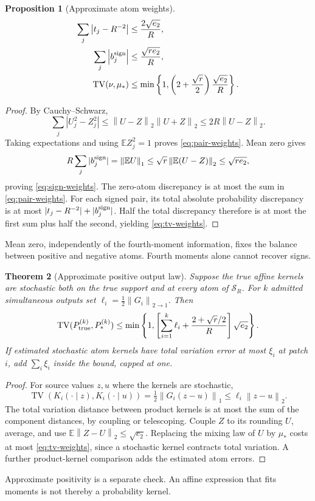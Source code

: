 \documentclass[11pt]{article}
\newtheorem{theorem}{Theorem}[section]
\newtheorem{proposition}[theorem]{Proposition}
\theoremstyle{definition}
\theoremstyle{remark}
\newcommand{\E}{\mathbb E}
\newcommand{\TV}{\operatorname{TV}}
\newcommand{\norm}[1]{\left\lVert#1\right\rVert}
\newcommand{\abs}[1]{\left\lvert#1\right\rvert}
\begin{document}
\begin{proposition}[Approximate atom weights]
\label{prop:weights}
\begin{align}
\sum_j\abs{t_j-R^{-2}}&\le\frac{2\sqrt{e_2}}R,
\label{eq:pair-weights}\\
\sum_j\abs{b_j^{\rm sign}}&\le\frac{\sqrt{re_2}}R,
\label{eq:sign-weights}\\
\TV(\nu,\mu_*)&\le
\min\left\{1,\left(2+\frac{\sqrt r}2\right)
\frac{\sqrt{e_2}}R\right\}.
\label{eq:tv-weights}
\end{align}
\end{proposition}
\begin{proof}
By Cauchy--Schwarz,
\[
\sum_j|U_j^2-Z_j^2|
\le\norm{U-Z}_2\norm{U+Z}_2
\le2R\norm{U-Z}_2.
\]
Taking expectations and using $\E Z_j^2=1$ proves
\eqref{eq:pair-weights}. Mean zero gives
\[
R\sum_j|b_j^{\rm sign}|=\norm{\E U}_1
\le\sqrt r\norm{\E(U-Z)}_2\le\sqrt{re_2},
\]
proving \eqref{eq:sign-weights}. The zero-atom discrepancy is at most the
sum in \eqref{eq:pair-weights}. For each signed pair, its total absolute
probability discrepancy is at most
$|t_j-R^{-2}|+|b_j^{\rm sign}|$. Half the total discrepancy therefore is
at most the first sum plus half the second, yielding
\eqref{eq:tv-weights}.
\end{proof}
Mean zero, independently of the fourth-moment information, fixes the
balance between positive and negative atoms. Fourth moments alone cannot
recover signs.

\begin{theorem}[Approximate positive output law]
\label{thm:tv-output}
Suppose the true affine kernels are stochastic both on the true support
and at every atom of $\mathcal S_R$. For $k$ admitted simultaneous outputs
set $\ell_i=\frac12\norm{G_i}_{2\to1}$. Then
\begin{equation}
\TV(P_{\rm true}^{(k)},P_*^{(k)})
\le\min\left\{1,
\left[\sum_{i=1}^k\ell_i+
\frac{2+\sqrt r/2}{R}\right]\sqrt{e_2}\right\}.
\label{eq:output-tv}
\end{equation}
If estimated stochastic atom kernels have total variation error at most
$\xi_i$ at patch $i$, add $\sum_i\xi_i$ inside the bound, capped at one.
\end{theorem}
\begin{proof}
For source values $z,u$ where the kernels are stochastic,
\[
\TV(K_i(\cdot\mid z),K_i(\cdot\mid u))
=\tfrac12\norm{G_i(z-u)}_1\le\ell_i\norm{z-u}_2.
\]
The total variation distance between product kernels is at most the sum
of the component distances, by coupling or telescoping. Couple $Z$ to
its rounding $U$, average, and use
$\E\norm{Z-U}_2\le\sqrt{e_2}$. Replacing the mixing law of $U$ by
$\mu_*$ costs at most \eqref{eq:tv-weights}, since a stochastic kernel
contracts total variation. A further product-kernel comparison adds the
estimated atom errors.
\end{proof}
Approximate positivity is a separate check. An affine expression that fits
moments is not thereby a probability kernel.
\end{document}
